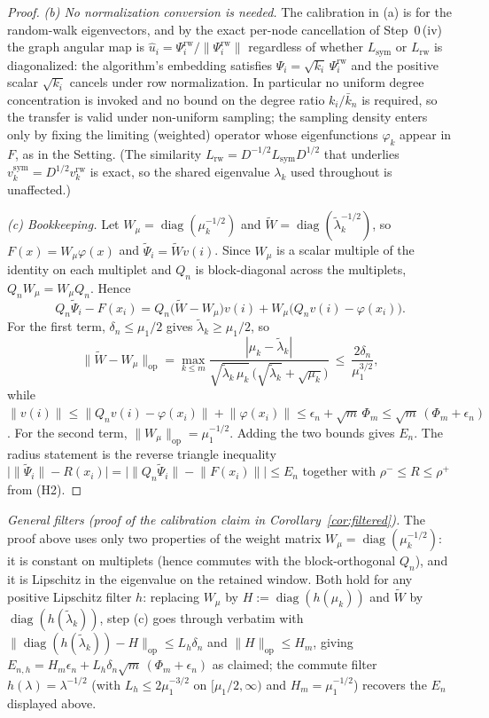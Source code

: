 \documentclass[11pt]{article}
\theoremstyle{remark}
\begin{document}
\begin{proof}
\emph{(b) No normalization conversion is needed.} The calibration in (a) is for
the random-walk eigenvectors, and by the exact per-node cancellation of
Step~0\,(iv) the graph angular map is
$\hat u_i=\Psi^{\mathrm{rw}}_i/\lVert\Psi^{\mathrm{rw}}_i\rVert$ regardless of
whether $L_{\mathrm{sym}}$ or $L_{\mathrm{rw}}$ is diagonalized: the algorithm's
embedding satisfies $\Psi_i=\sqrt{k_i}\,\Psi^{\mathrm{rw}}_i$ and the positive
scalar $\sqrt{k_i}$ cancels under row normalization. In particular no uniform
degree concentration is invoked and no bound on the degree ratio $k_i/\bar k_n$
is required, so the transfer is valid under non-uniform sampling; the sampling
density enters only by fixing the limiting (weighted) operator whose
eigenfunctions $\varphi_k$ appear in $F$, as in the Setting. (The similarity
$L_{\mathrm{rw}}=D^{-1/2}L_{\mathrm{sym}}D^{1/2}$ that underlies
$v^{\mathrm{sym}}_k=D^{1/2}v^{\mathrm{rw}}_k$ is exact, so the shared eigenvalue
$\lambda_k$ used throughout is unaffected.)

\emph{(c) Bookkeeping.} Let $W_\mu=\operatorname{diag}(\mu_k^{-1/2})$ and
$\widetilde W=\operatorname{diag}(\tilde\lambda_k^{-1/2})$, so
$F(x)=W_\mu\varphi(x)$ and $\widetilde\Psi_i=\widetilde W v(i)$. Since $W_\mu$
is a scalar multiple of the identity on each multiplet and $Q_n$ is
block-diagonal across the multiplets, $Q_nW_\mu=W_\mu Q_n$. Hence
\[
Q_n\widetilde\Psi_i-F(x_i)
=Q_n\big(\widetilde W-W_\mu\big)v(i)
+W_\mu\big(Q_nv(i)-\varphi(x_i)\big).
\]
For the first term, $\delta_n\le\mu_1/2$ gives $\tilde\lambda_k\ge\mu_1/2$, so
\[
\big\lVert\widetilde W-W_\mu\big\rVert_{\mathrm{op}}
=\max_{k\le m}\frac{|\mu_k-\tilde\lambda_k|}
{\sqrt{\tilde\lambda_k\,\mu_k}\,\big(\sqrt{\tilde\lambda_k}+\sqrt{\mu_k}\big)}
\ \le\ \frac{2\delta_n}{\mu_1^{3/2}},
\]
while $\lVert v(i)\rVert\le\lVert Q_nv(i)-\varphi(x_i)\rVert
+\lVert\varphi(x_i)\rVert\le\epsilon_n+\sqrt m\,\Phi_m
\le\sqrt m\,(\Phi_m+\epsilon_n)$. For the second term,
$\lVert W_\mu\rVert_{\mathrm{op}}=\mu_1^{-1/2}$. Adding the two bounds gives
$E_n$. The radius statement is the reverse triangle inequality
$\big|\lVert\widetilde\Psi_i\rVert-R(x_i)\big|
=\big|\lVert Q_n\widetilde\Psi_i\rVert-\lVert F(x_i)\rVert\big|\le E_n$
together with $\rho^-\le R\le\rho^+$ from (H2).
\end{proof}

\emph{General filters (proof of the calibration claim in
Corollary~\ref{cor:filtered}).} The proof above uses only two properties of
the weight matrix $W_\mu=\operatorname{diag}(\mu_k^{-1/2})$: it is constant on
multiplets (hence commutes with the block-orthogonal $Q_n$), and it is
Lipschitz in the eigenvalue on the retained window. Both hold for any positive
Lipschitz filter $h$: replacing $W_\mu$ by
$H:=\operatorname{diag}(h(\mu_k))$ and $\widetilde W$ by
$\operatorname{diag}(h(\tilde\lambda_k))$, step (c) goes through verbatim with
$\lVert\operatorname{diag}(h(\tilde\lambda_k))-H\rVert_{\mathrm{op}}
\le L_h\delta_n$ and $\lVert H\rVert_{\mathrm{op}}\le H_m$, giving
$E_{n,h}=H_m\epsilon_n+L_h\delta_n\sqrt m\,(\Phi_m+\epsilon_n)$ as claimed;
the commute filter $h(\lambda)=\lambda^{-1/2}$ (with $L_h\le2\mu_1^{-3/2}$ on
$[\mu_1/2,\infty)$ and $H_m=\mu_1^{-1/2}$) recovers the $E_n$ displayed above.
\end{document}
